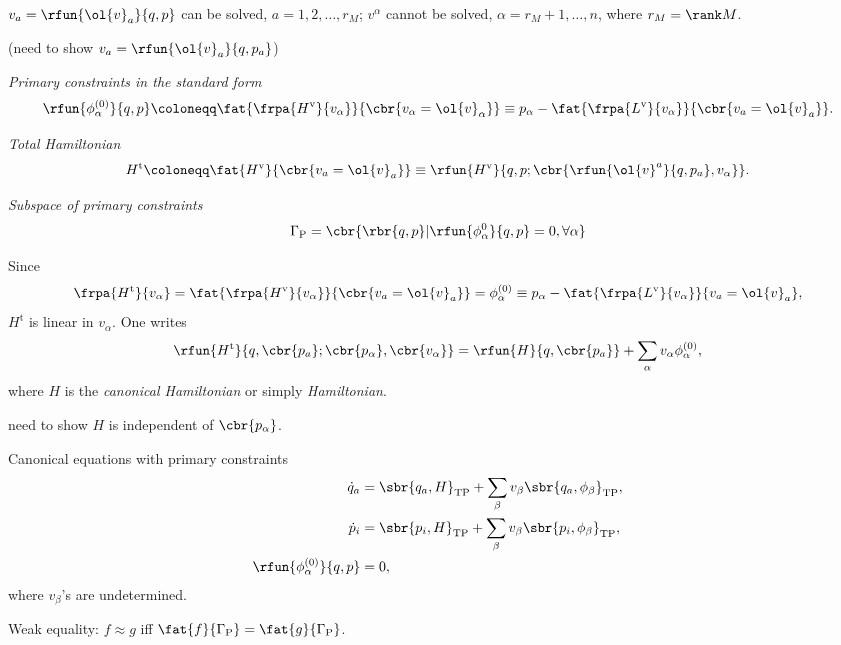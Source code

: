 \documentclass[a4paper,10pt]{article}
\begin{document}
$v_a = \rfun{\ol{v}_a}{q,p}$ can be solved, $a = 1, 2, \ldots, r_M$; $v^\alpha$ 
cannot be solved, $\alpha = r_M + 1, \ldots, n$, where $r_M = \rank M$.

(need to show $v_a = \rfun{\ol{v}_a}{q,p_a}$)

\emph{Primary constraints in the standard form}
\begin{equation}
\rfun{\phi_\alpha^{(0)}}{q, p} \coloneqq
\fat{\frpa{H^\text{v}}{v_\alpha}}{\cbr{v_\alpha = \ol{v}_\alpha}} \equiv
p_\alpha - \fat{\frpa{L^\text{v}}{v_\alpha}}{\cbr{v_a = \ol{v}_a}}.
\end{equation}

\emph{Total Hamiltonian}
\begin{equation}
H^\text{t} \coloneqq \fat{H^\text{v}}{\cbr{v_a = \ol{v}_a}} \equiv
\rfun{H^\text{v}}{q, p; \cbr{\rfun{\ol{v}^a}{q, p_a}, v_\alpha}}.
\end{equation}

\emph{Subspace of primary constraints}
\begin{equation}
\Gamma_\text{P} = \cbr{ \rbr{q, p} | \rfun{\phi_\alpha^{0}}{q, p} = 0, \forall 
\alpha}
\end{equation}

Since
\begin{equation}
\frpa{H^\text{t}}{v_\alpha} =
\fat{\frpa{H^\text{v}}{v_\alpha}}{\cbr{v_a = \ol{v}_a}} = \phi_\alpha^{(0)}
\equiv p_\alpha - \fat{\frpa{L^\text{v}}{v_\alpha}}{v_a = \ol{v}_a},
\end{equation}
$H^\text{t}$ is linear in $v_\alpha$. One writes
\begin{equation}
\rfun{H^\text{t}}{q, \cbr{p_a}; \cbr{p_\alpha}, \cbr{v_\alpha}} = \rfun{H}{q, 
\cbr{p_a}} + \sum_\alpha v_\alpha \phi_\alpha^{(0)},
\end{equation}
where $H$ is the \emph{canonical Hamiltonian} or simply \emph{Hamiltonian}. 

need to show $H$ is independent of $\cbr{p_\alpha}$.

Canonical equations with primary constraints
\begin{align}
\dot{q}_a &= \sbr{q_a, H}_\text{TP} + \sum_\beta v_\beta 
\sbr{q_a, \phi_\beta}_\text{TP}, \\
\dot{p}_i &= \sbr{p_i, H}_\text{TP} + \sum_\beta v_\beta 
\sbr{p_i, \phi_\beta}_\text{TP}, \\
\rfun{\phi_\alpha^{(0)}}{q, p} &= 0,
\end{align}
where $v_\beta$'s are undetermined.

Weak equality: $f \approx g$ iff $\fat{f}{\Gamma_\text{P}} = 
\fat{g}{\Gamma_\text{P}}$.
\end{document}
